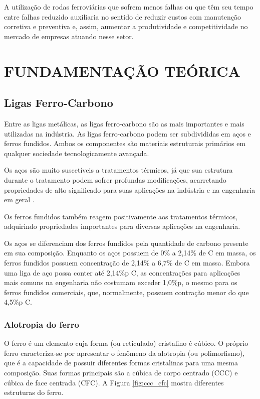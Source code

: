 \documentclass[
12pt,
openany, %
oneside, %
a4paper,			
english,			
brazil			        %
]{abntbibufjf}
\begin{document}
	A utilização de rodas ferroviárias que sofrem menos falhas ou que têm seu tempo entre falhas reduzido auxiliaria no sentido de reduzir custos com manutenção corretiva e preventiva e, assim, aumentar a produtividade e competitividade no mercado de empresas atuando nesse setor.

	



	
\chapter{FUNDAMENTAÇÃO TEÓRICA}
	
\section{Ligas Ferro-Carbono}
\label{sec:liga_fe-c}

	Entre as ligas metálicas, as ligas ferro-carbono são as mais importantes e mais utilizadas na indústria. As ligas ferro-carbono podem ser subdivididas em aços e ferros fundidos. Ambos os componentes são materiais estruturais primários em qualquer sociedade tecnologicamente avançada.
	
	Os aços são muito suscetíveis a tratamentos térmicos, já que sua estrutura durante o tratamento podem sofrer profundas modificações, acarretando propriedades de alto significado para suas aplicações na indústria e na engenharia em geral \cite{chiaverini2003tratamentos}.
	
	Os ferros fundidos também reagem positivamente aos tratamentos térmicos, adquirindo propriedades importantes para diversas aplicações na engenharia.
	
	Os aços se diferenciam dos ferros fundidos pela quantidade de carbono presente em sua composição. Enquanto os aços possuem de 0\% a 2,14\% de C em massa, os ferros fundidos possuem concentração de 2,14\% a 6,7\% de C em massa. Embora uma liga de aço possa conter até 2,14\%p C, as concentrações para aplicações mais comuns na engenharia não costumam exceder 1,0\%p, o mesmo para os ferros fundidos comerciais, que, normalmente, possuem contração menor do que 4,5\%p C.
	
\subsection{Alotropia do ferro}

	O ferro é um elemento cuja forma (ou reticulado) cristalino é cúbico. O próprio ferro caracteriza-se por apresentar o fenômeno da alotropia (ou polimorfismo), que é a capacidade de possuir diferentes formas cristalinas para uma mesma composição. Suas formas principais são a cúbica de corpo  centrado (CCC) e cúbica de face centrada (CFC). A Figura \ref{fig:ccc_cfc} mostra diferentes estruturas do ferro.
	
\end{document}
